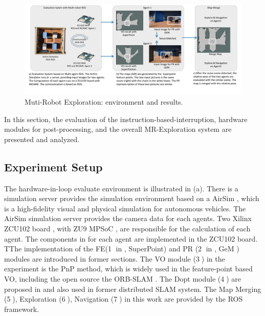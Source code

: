 \label{sec:experiments}


\begin{figure}[t]
  \centering
  \includegraphics[width=0.9\linewidth]{fig/env.pdf}
  \caption{Muti-Robot Exploration: environment and results. }
  \label{fig:env}
\end{figure}

In this section, the evaluation of the instruction-based-interruption, hardware modules for post-processing, and the overall MR-Exploration system are presented and analyzed.

\subsection{ Experiment Setup }

The hardware-in-loop evaluate environment is illustrated in (a). There is a simulation server provides the simulation environment based on a AirSim \cite{shah2018airsim}, which is a high-fidelity visual and physical simulation for autonomous vehicles. The AirSim simulation server provides the camera data for each agents. Two Xilinx ZCU102 board \cite{zcu102}, with ZU9 MPSoC \cite{MPSoC}, are responsible for the calculation of each agent. 
The components in  for each agent are implemented in the ZCU102 board. TThe implementation of the FE(\textcircled{1} in , SuperPoint\cite{detone2018superpoint}) and PR (\textcircled{2} in , GeM \cite{radenovic2018fine}) modules are introduced in former sections. 
The VO module (\textcircled{3}) in the experiment is the PnP \cite{LepetitMoreno-Noguer-EPnP} method, which is widely used in the feature-point based VO, including the open source the ORB-SLAM \cite{Mur-Artal:2017281}. 
The Dopt module (\textcircled{4}) are proposed in \cite{Choudhary:2017e66} and also used in former distributed SLAM system\cite{cieslewski2018data}. 
The Map Merging \cite{Andre2014} (\textcircled{5}), Exploration \cite{8202319} (\textcircled{6}), Navigation \cite{tbd} (\textcircled{7}) in this work are provided by the ROS framework. 

